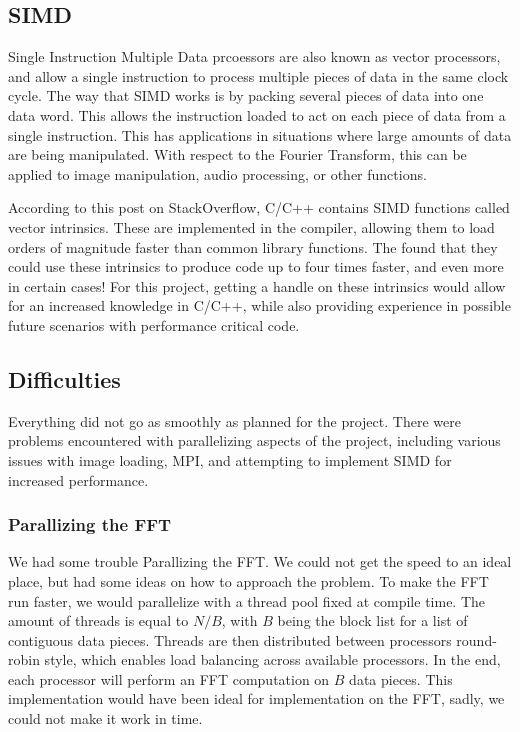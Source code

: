 \documentclass[12pt]{extarticle}
\begin{document}
\subsection*{SIMD}
    
    Single Instruction Multiple Data prcoessors are also known as vector processors, and allow a single instruction
    to process multiple pieces of data in the same clock cycle. The way that SIMD works is by packing several pieces of data
    into one data word. This allows the instruction loaded to act on each piece of data from a single instruction.
    This has applications in situations where large amounts of data are being manipulated. With respect to the Fourier Transform,
    this can be applied to image manipulation, audio processing, or other functions.

    According to this post\cite{Konstantin:2020} on StackOverflow, C/C++ contains SIMD functions called vector intrinsics.
    These are implemented in the compiler, allowing them to load orders of magnitude faster than common library functions. 
    The found that they could use these intrinsics to produce code up to four times faster, and even more in certain cases!
    For this project, getting a handle on these intrinsics would allow for an increased knowledge in C/C++, while also providing
    experience in possible future scenarios with performance critical code.

\subsection*{Difficulties}
	Everything did not go as smoothly as planned for the project. There were problems encountered with parallelizing aspects of the 
	project, including various issues with image loading, MPI, and attempting to implement SIMD for increased performance.

	\subsubsection*{Parallizing the FFT}
		We had some trouble Parallizing the FFT.
		We could not get the speed to an ideal place, but had some ideas on how to approach the problem.
		To make the FFT run faster, we would parallelize with a thread pool fixed at compile time. 
    	The amount of threads is equal to $N/B$, with $B$ being the block list for a list of contiguous data pieces. 
    Threads are then distributed between processors round-robin style, which enables load balancing across available processors.
    In the end, each processor will perform an FFT computation on $B$ data pieces.
    This implementation would have been ideal for implementation on the FFT, sadly, we could not make it work in time.
\end{document}
